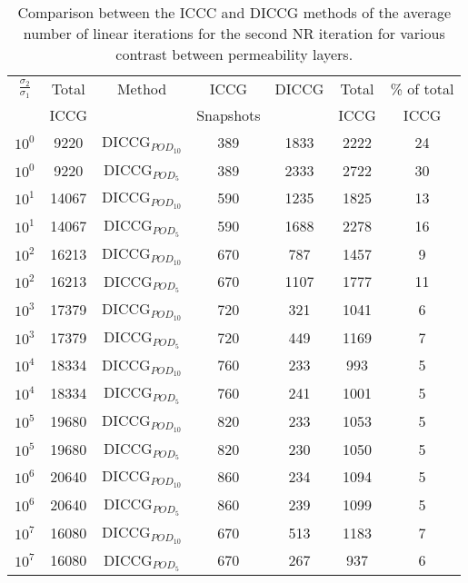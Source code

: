 \documentclass[12pt]{article}
\begin{document}
\begin{table}[!ht]\centering
\begin{minipage}{1\textwidth}
 \centering
\begin{tabular}{ ||c|c||c|c|c|c|c||} 
\hline
$\frac{\sigma_2}{\sigma_1}$&Total&Method  & ICCG&DICCG &Total&\% of total\\ 
                           & ICCG     &  & Snapshots& &ICCG& ICCG\\ 
\hline  
$10^{0}$ &9220& DICCG$_{POD_{10}}$&389&1833&2222&24 \\ 
\hline  
$10^{0}$ &9220& DICCG$_{POD_{5}}$&389&2333&2722&30 \\ 
\hline 
$10^{1}$ &14067& DICCG$_{POD_{10}}$&590&1235&1825&13 \\ 
\hline  
$10^{1}$ &14067& DICCG$_{POD_{5}}$&590&1688&2278&16 \\ 
\hline 
$10^{2}$ &16213& DICCG$_{POD_{10}}$&670&787&1457&9 \\ 
\hline  
$10^{2}$ &16213& DICCG$_{POD_{5}}$&670&1107&1777&11 \\ 
\hline 
$10^{3}$ &17379& DICCG$_{POD_{10}}$&720&321&1041&6 \\ 
\hline  
$10^{3}$ &17379& DICCG$_{POD_{5}}$&720&449&1169&7 \\ 
\hline  
$10^{4}$ &18334& DICCG$_{POD_{10}}$&760&233&993&5 \\ 
\hline  
$10^{4}$ &18334& DICCG$_{POD_{5}}$&760&241&1001&5 \\ 
\hline  
$10^{5}$ &19680& DICCG$_{POD_{10}}$&820&233&1053&5 \\ 
\hline  
$10^{5}$ &19680& DICCG$_{POD_{5}}$&820&230&1050&5 \\ 
\hline 
$10^{6}$ &20640& DICCG$_{POD_{10}}$&860&234&1094&5 \\ 
\hline  
$10^{6}$ &20640& DICCG$_{POD_{5}}$&860&239&1099&5 \\ 
\hline 
$10^{7}$ &16080& DICCG$_{POD_{10}}$&670&513&1183&7 \\ 
\hline  
$10^{7}$ &16080& DICCG$_{POD_{5}}$&670&267&937&6 \\ 
\hline  
\end{tabular} 
\caption{Comparison between the ICCC and DICCG methods of the average number of linear iterations for the second NR iteration for various contrast between permeability layers. }\label{table:litertotw2} 
\end{minipage}  
\end{table}  
\end{document}
